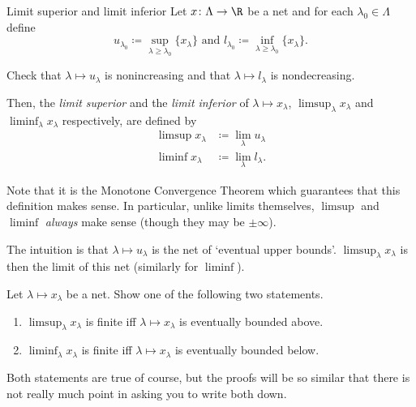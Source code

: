\begin{dfn}{Limit superior and limit inferior}{}
Let $x\colon \Lambda \rightarrow \R$ be a net and for each $\lambda _0\in \Lambda$ define
\begin{equation}\label{3.3.48}
u_{\lambda _0}\coloneqq \sup _{\lambda \geq \lambda _0}\{ x_\lambda \} \text{ and }l_{\lambda _0}\coloneqq \inf _{\lambda \geq \lambda _0}\{ x_\lambda \} .
\end{equation}
\begin{exr}[breakable=false]{}{}
Check that $\lambda \mapsto u_\lambda$ is nonincreasing and that $\lambda \mapsto l_\lambda$ is nondecreasing.
\end{exr}
Then, the \emph{limit superior} and the \emph{limit inferior} of $\lambda \mapsto x_{\lambda}$, $\limsup _{\lambda}x_{\lambda}$ and $\liminf _{\lambda}x_{\lambda}$ respectively, are defined by
\begin{subequations}\label{3.3.50}
\begin{align}
\limsup x_\lambda & \coloneqq \lim _\lambda u_\lambda \\
\liminf x_\lambda &\coloneqq \lim _\lambda l_\lambda .
\end{align}
\end{subequations}
\begin{rmk}
Note that it is the Monotone Convergence Theorem which guarantees that this definition makes sense.  In particular, unlike limits themselves, $\limsup$ and $\liminf$ \emph{always} make sense (though they may be $\pm \infty$).
\end{rmk}
\begin{rmk}
The intuition is that $\lambda \mapsto u_\lambda$ is the net of `eventual upper bounds'.  $\limsup _\lambda x_\lambda$ is then the limit of this net (similarly for $\liminf$).
\end{rmk}
\end{dfn}
\begin{exr}{}{}
Let $\lambda \mapsto x_\lambda$ be a net.  Show one of the following two statements.
\begin{enumerate}
\item $\limsup _\lambda x_\lambda$ is finite iff $\lambda \mapsto x_\lambda$ is eventually bounded above.
\item $\liminf _\lambda x_\lambda$ is finite iff $\lambda \mapsto x_\lambda$ is eventually bounded below.
\end{enumerate}
\begin{rmk}
Both statements are true of course, but the proofs will be so similar that there is not really much point in asking you to write both down.
\end{rmk}
\end{exr}
